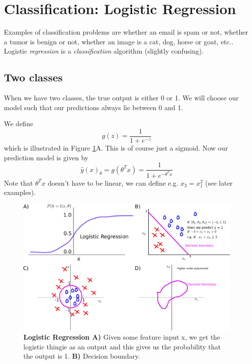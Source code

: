 \documentclass[a4paper, 10pt,hidelinks]{article}
\begin{document}
\clearpage
\section{Classification: Logistic Regression}
Examples of classification problems are whether an email is spam or not, whether a tumor is benign or not, whether an image is a cat, dog, horse or goat, etc.. Logistic \emph{regression} is a \emph{classification} algorithm (slightly confusing). 

\subsection{Two classes}
When we have two classes, the true output is either 0 or 1. We will choose our model such that our predictions always lie between 0 and 1. 

We define
\begin{equation}
g(z) = \frac{1}{1 + e^{-z}}
\end{equation}
which is illustrated in Figure \ref{Fig: Logistic regression}A. This is of course just a sigmoid. Now our prediction model is given by 
\begin{equation}
\hat{y}(x)_{\theta} = g(\theta^T x) = \frac{1}{1 + e^{-\theta^T x}}
\end{equation}
Note that $\theta^T x$ doesn't have to be linear, we can define e.g. $x_3 = x_1^2$ (see later examples).

\begin{figure}[h!]
\includegraphics[width=0.9\linewidth]{LogisticRegr}
\caption{\footnotesize{\textbf{Logistic Regression A)} Given some feature input x, we get the logistic thingie as an output and this gives us the probability that the output is 1. \textbf{B)} Decision boundary. }}
\label{Fig: Logistic regression}
\end{figure}
\end{document}
